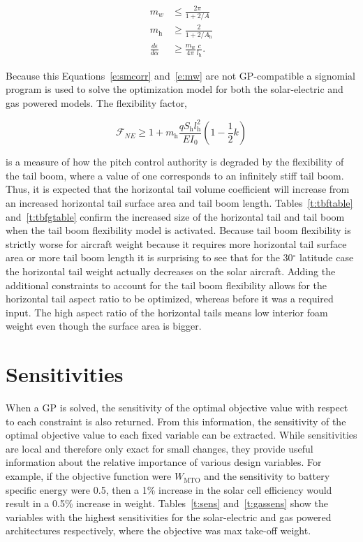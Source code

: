 \begin{align}
    \label{e:mw}
    m_w &\leq \frac{2\pi}{1 + 2/A} \\
    m_\text{h} &\geq \frac{2}{1 + 2/A_{\text{h}}} \\
    \frac{d\epsilon}{d\alpha} &\geq \frac{m_w}{4\pi} \frac{c}{l_\text{h}}.
\end{align}

Because this Equations~\eqref{e:smcorr} and~\eqref{e:mw} are not GP-compatible a signomial program is used to solve the optimization model for both the solar-electric and gas powered models.\cite{sp}\cite{gp}
The flexibility factor,

\begin{equation}
    \mathcal{F}_{NE} \geq 1 + m_{\text{h}} \frac{qS_{\text{h}}l_{\text{h}}^2}{EI_0}(1-\frac{1}{2}k) 
\end{equation}

is a measure of how the pitch control authority is degraded by the flexibility of the tail boom, where a value of one corresponds to an infinitely stiff tail boom. 
Thus, it is expected that the horizontal tail volume coefficient will increase from an increased horizontal tail surface area and tail boom length. 
Tables~\ref{t:tbftable} and~\ref{t:tbfgtable} confirm the increased size of the horizontal tail and tail boom when the tail boom flexibility model is activated. 
Because tail boom flexibility is strictly worse for aircraft weight because it requires more horizontal tail surface area or more tail boom length it is surprising to see that for the 30$^{\circ}$ latitude case the horizontal tail weight actually decreases on the solar aircraft.  
Adding the additional constraints to account for the tail boom flexibility allows for the horizontal tail aspect ratio to be optimized, whereas before it was a required input. 
The high aspect ratio of the horizontal tails means low interior foam weight even though the surface area is bigger. 

\newpage




\section{Sensitivities}

When a GP is solved, the sensitivity of the optimal objective value with respect to each constraint is also returned.  
From this information, the sensitivity of the optimal objective value to each fixed variable can be extracted.\cite{hoburgthesis} 
While sensitivities are local and therefore only exact for small changes, they provide useful information about the relative importance of various design variables. 
For example, if the objective function were $W_{\text{MTO}}$ and the sensitivity to battery specific energy were 0.5, then a 1\% increase in the solar cell efficiency would result in a 0.5\% increase in weight.  
Tables~\ref{t:sens} and~\ref{t:gassens} show the variables with the highest sensitivities for the solar-electric and gas powered architectures respectively, where the objective was max take-off weight.

